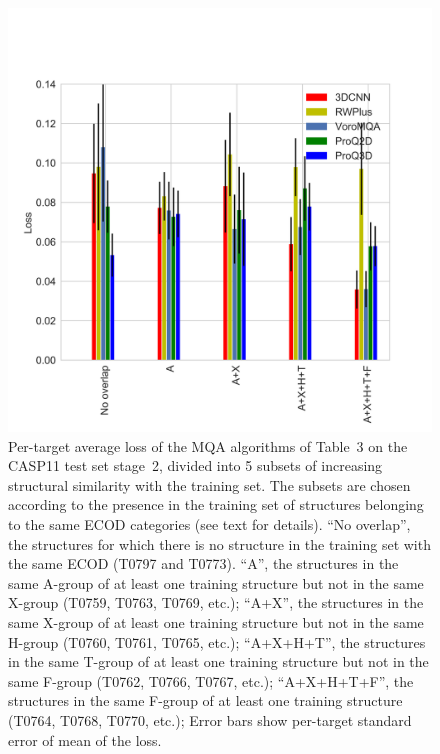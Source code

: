 \documentclass[letter,10pt]{article}
\begin{document}
\begin{figure}[H]
    \centering
    \includegraphics[width=\linewidth]{Fig/LossVsECOD.png}
%
    \caption{Per-target average loss of the MQA algorithms of Table~3
    on the CASP11 test set stage~2, divided into 5 subsets of
    increasing structural similarity with the training set. The
    subsets are chosen according to the presence in the training set
    of structures belonging to the same ECOD categories (see text for
    details). 
    ``No overlap'', the structures for which there is no structure in the training set with 
    the same ECOD (T0797 and T0773). 
    ``A'', the structures in the same A-group of at least one training
    structure but not in the same X-group (T0759, T0763, T0769, etc.); 
    ``A+X'', the structures in the same X-group of at least one training
    structure but not in the same H-group (T0760, T0761, T0765, etc.);
    ``A+X+H+T'', the structures in the same T-group of at least one
    training structure but not in the same F-group (T0762, T0766, T0767,
    etc.);
    ``A+X+H+T+F'', the structures in the same F-group of at least one
    training structure (T0764, T0768, T0770, etc.);
    Error bars show per-target standard error of mean of the loss.}
%
    \label{Fig:LossVsECOD}
\end{figure}
\end{document}
